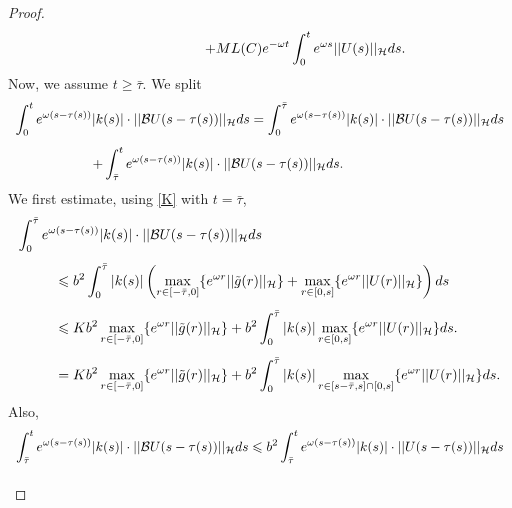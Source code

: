 \documentclass[11pt]{article}
\renewcommand{\geq}{\geqslant}
\renewcommand{\leq}{\leqslant}
\begin{document}
\begin{proof}
\begin{equation}
\begin{array}{l}
\displaystyle{ \hspace{2.3 cm}+ML(C)e^{-\omega t} \int_0^t e^{\omega s} ||U(s)||_{\mathcal H} ds.}
\end{array}
\end{equation}
Now, we assume $t\geq\bar{\tau}$. We split
\begin{equation}\label{casotmagtau}
	\begin{array}{l}
		\vspace{0.3cm}\displaystyle{\int_0^t e^{\omega (s-\tau(s))} |k(s)|\cdot ||\mathcal{B}U(s-\tau(s))||_{\mathcal H}ds=\int_0^{\bar{\tau}} e^{\omega (s-\tau(s))} |k(s)|\cdot ||\mathcal{B}U(s-\tau(s))||_{\mathcal H}ds}\\
		\displaystyle{\hspace{2cm}+\int_{\bar{\tau}}^t e^{\omega (s-\tau(s))} |k(s)|\cdot ||\mathcal{B}U(s-\tau(s))||_{\mathcal H}ds.}
	\end{array} 
\end{equation}
We first estimate, using \eqref{K} with $t=\bar{\tau}$,
$$\begin{array}{l}
	\vspace{0.3cm}\displaystyle{\int_0^{\bar{\tau}} e^{\omega (s-\tau(s))} |k(s)|\cdot ||\mathcal{B}U(s-\tau(s))||_{\mathcal H}ds}\\
	\vspace{0.3cm}\displaystyle{\hspace{1cm}\leq b^2\int_0^{\bar{\tau}}  |k(s)|\left(\max_{r\in[-\bar{\tau},0]}\{e^{\omega r}||\tilde{g}(r)||_{\mathcal H}\}+\max_{r\in[0,s]}\{e^{\omega r}||U(r)||_{\mathcal H}\}\right) ds}\\
	\vspace{0.3cm}\displaystyle{\hspace{1cm}\leq Kb^2\max_{r\in[-\bar{\tau},0]}\{e^{\omega r}||\tilde{g}(r)||_{\mathcal H}\}+b^2\int_{0}^{\bar{\tau}}|k(s)|\max_{r\in[0,s]}\{e^{\omega r}||U(r)||_{\mathcal H}\} ds.}\\
	\displaystyle{\hspace{1cm}= Kb^2\max_{r\in[-\bar{\tau},0]}\{e^{\omega r}||\tilde{g}(r)||_{\mathcal H}\}+b^2\int_{0}^{\bar{\tau}}|k(s)|\max_{r\in[s-\bar{\tau},s]\cap[0,s]}\{e^{\omega r}||U(r)||_{\mathcal H}\} ds.}
\end{array}$$
Also,
$$\begin{array}{l}
	\vspace{0.3cm}\displaystyle{\int_{\bar{\tau}}^t e^{\omega (s-\tau(s))} |k(s)|\cdot ||\mathcal{B}U(s-\tau(s))||_{\mathcal H}ds\leq b^2\int_{\bar{\tau}}^t e^{\omega (s-\tau(s))} |k(s)|\cdot ||U(s-\tau(s))||_{\mathcal H}ds}\\

\end{array}$$
\end{proof}
\end{document}
